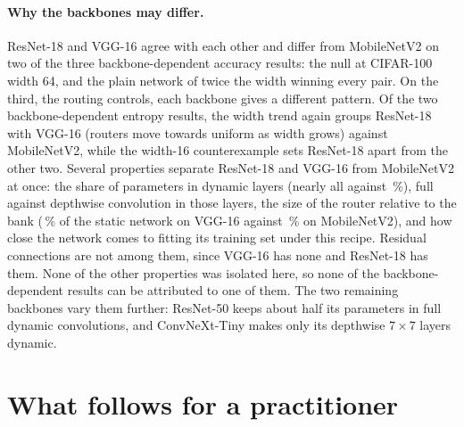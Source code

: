 \documentclass[10pt,a4paper]{article}
\begin{document}
\paragraph{Why the backbones may differ.} ResNet-18 and VGG-16 agree with
each other and differ from MobileNetV2 on two of the three
backbone-dependent accuracy results: the null at CIFAR-100 width 64, and
the plain network of twice the width winning every pair. On the third, the
routing controls, each backbone gives a different pattern. Of the two
backbone-dependent entropy results, the width trend again groups ResNet-18
with VGG-16 (routers move towards uniform as width grows) against
MobileNetV2, while the width-16 counterexample sets ResNet-18 apart from
the other two. Several
properties separate ResNet-18 and VGG-16 from MobileNetV2 at once: the share of parameters in dynamic layers (nearly all
against \,\%), full against depthwise convolution in those
layers, the size of the router relative to the bank (\,\% of
the static network on VGG-16 against \,\% on MobileNetV2),
and how close the network comes to fitting its training set under this
recipe. Residual connections are not among them, since VGG-16 has none and
ResNet-18 has them. None of the other properties was isolated here, so
none of the backbone-dependent results can be attributed to one of them.
The two remaining backbones vary them further: ResNet-50 keeps about half
its parameters in full dynamic convolutions, and ConvNeXt-Tiny makes only
its depthwise $7\times7$ layers dynamic.

\section{What follows for a practitioner}\label{sec:practice}
\end{document}
